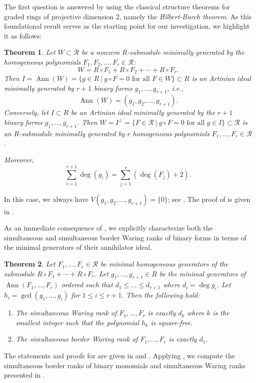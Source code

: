 \documentclass[a4paper, 11pt]{amsart}
\newtheorem{theorem}{Theorem}
\numberwithin{theorem}{section}
\theoremstyle{definition}
\numberwithin{equation}{section}
\DeclareMathOperator{\Ann}{\operatorname{Ann}}
\begin{document}
The first question is answered by using the classical structure theorems for graded rings of projective dimension $2$, namely the \emph{Hilbert-Burch theorem}.
As this foundational result serves as the starting point for our investigation, we highlight it as follows:
\begin{theorem}\label{thm:main}
Let $W \subset \mathcal{R}$ be a nonzero $R$-submodule minimally generated by the homogeneous polynomials $F_1, F_2, \dots, F_r \in \mathcal{R}$:
\[
W = R \circ F_1 + R \circ F_2 + \cdots + R \circ F_r.
\]
Then $I=\Ann(W)=\{g\in R~|~g\circ F=0 \text{~for all~} F\in W\}\subset R$ is an Artinian ideal minimally generated by $r+1$ binary forms $g_1,\ldots,g_{r+1}$, i.e.,
$$
\Ann(W) = (g_1, g_2, \dots, g_{r+1}).
$$
Conversely, let $I\subset R$ be an Artinian ideal minimally generated by the $r+1$ binary forms $g_1,\ldots,g_{r+1}$.
Then $W=I^{\perp}=\{F\in \mathcal{R}~|~g\circ F=0\text{~for all~} g\in I\}\subset \mathcal{R}$ is an $R$-submodule minimally generated by $r$ homogeneous polynomials $F_1,\ldots,F_r\in \mathcal{R}$.

Moreover, 
$$
\sum_{i = 1}^{r+1} \deg(g_i) = \sum_{j = 1}^{r} (\deg(F_j) + 2).
$$
\end{theorem}
   In this case, we always have $V(g_1,g_2,\ldots,g_{r+1}) = \{0\}$; see .
The proof of  is given in .

As an immediate consequence of , we explicitly characterize both the simultaneous and simultaneous border Waring ranks of binary forms in terms of the minimal generators of their annihilator ideal. 
\begin{theorem}\label{thm:simultaneousrank}
    Let $F_1, \dots, F_r \in \mathcal{R}$ be minimal homogeneous generators of the submodule $R \circ F_1 + \cdots + R \circ F_r$. 
    Let $g_1, \dots, g_{r+1} \in R$ be the minimal generators of $\Ann(F_1, \dots, F_r)$ ordered such that $d_1 \leq \dots \leq d_{r+1}$ where $d_i = \deg g_i$.
    Let $h_i = \gcd(g_1, \dots, g_i)$ for $1 \leq i \leq r+1$.
    Then the following hold:
    \begin{enumerate}
        \item \label{item:honestrank} The simultaneous Waring rank of $F_1, \dots, F_r$ is exactly $d_k$ where $k$ is the smallest integer such that the polynomial $h_k$ is square-free.
        \item \label{item:borderrank} The simultaneous border Waring rank of $F_1, \dots, F_r$ is exactly $d_1$.
    \end{enumerate}
\end{theorem}
The statements and proofs for  are given in  and .
Applying , we compute the simultaneous border ranks of binary monomials and simultaneous Waring ranks presented in .
\end{document}
